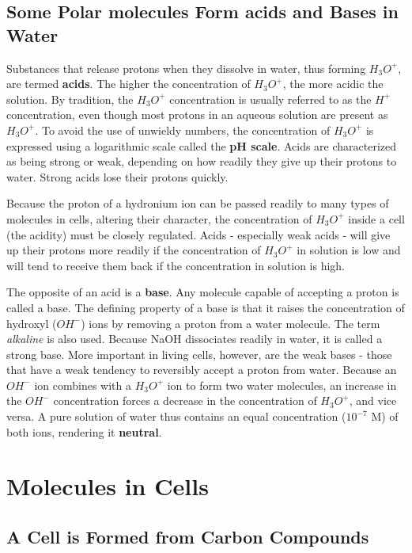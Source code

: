 \subsection{Some Polar molecules Form acids and Bases in Water}

Substances that release protons when they dissolve in water, thus forming
$H_{3}O^{+}$, are termed \textbf{acids}. The higher the concentration of $H_{3}O^{+}$, the
more acidic the solution.
By tradition, the $H_{3}O^{+}$ concentration is usually referred to as the $H^{+}$ concentration, even though
most protons in an aqueous solution are present as $H_{3}O^{+}$. To avoid the
use of unwieldy numbers, the concentration of $H_{3}O^{+}$ is expressed using
a logarithmic scale called the \textbf{pH scale}.
Acids are characterized as being strong or weak, depending on how
readily they give up their protons to water. Strong acids lose their protons quickly.

Because the proton of a hydronium ion can be passed readily to many
types of molecules in cells, altering their character, the concentration of
$H_{3}O^{+}$ inside a cell (the acidity) must be closely regulated. Acids - especially
weak acids - will give up their protons more readily if the concentration
of $H_{3}O^{+}$ in solution is low and will tend to receive them back if the concentration
in solution is high.

The opposite of an acid is a \textbf{base}. Any molecule capable of accepting a
proton is called a base. The defining property of a base is that it raises the concentration
of hydroxyl ($OH^{-}$) ions by removing a proton from a water molecule.
The term \textit{alkaline} is also used.
Because NaOH dissociates readily in water, it is called a strong base.
More important in living cells, however, are the weak bases - those that
have a weak tendency to reversibly accept a proton from water.
Because an $OH^{-}$ ion combines with a $H_{3}O^{+}$ ion to form two water molecules,
an increase in the $OH^{-}$ concentration forces a decrease in the
concentration of $H_{3}O^{+}$, and vice versa. A pure solution of water thus contains
an equal concentration ($10^{-7}$ M) of both ions, rendering it \textbf{neutral}.

\section{Molecules in Cells}

\subsection{A Cell is Formed from Carbon Compounds}

